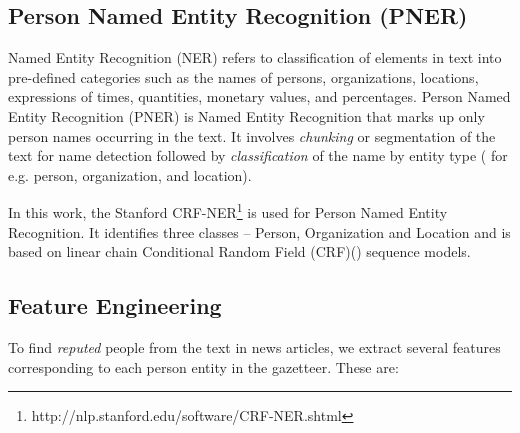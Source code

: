 \documentclass[a4paper,man,natbib]{apa6}
\begin{document}

\subsection{Person Named Entity Recognition (PNER)}
\label{ner}

\noindent Named Entity Recognition (NER) refers to classification of elements in text into pre-defined categories such as the names of persons, organizations, locations, expressions of times, quantities, monetary values, and percentages. 
Person Named Entity Recognition (PNER) is Named Entity Recognition that marks up only person names occurring in the text. It involves \emph{chunking} or segmentation of  the text for name detection followed by \emph{classification} of the name by entity type ( for e.g. person, organization, and location).


In this work, the Stanford CRF-NER\footnote{http://nlp.stanford.edu/software/CRF-NER.shtml} is used for Person Named Entity Recognition. It identifies three classes -- Person, Organization and Location and is based on linear chain Conditional Random Field (CRF)(\cite{mccallum2003early, finkel2005incorporating, sutton2011introduction}) sequence models. 

\subsection{Feature Engineering} 
\label{feat}
To find \emph{reputed} people from the text in news articles, we extract several features corresponding to each person entity in the gazetteer. These are:
\end{document}
